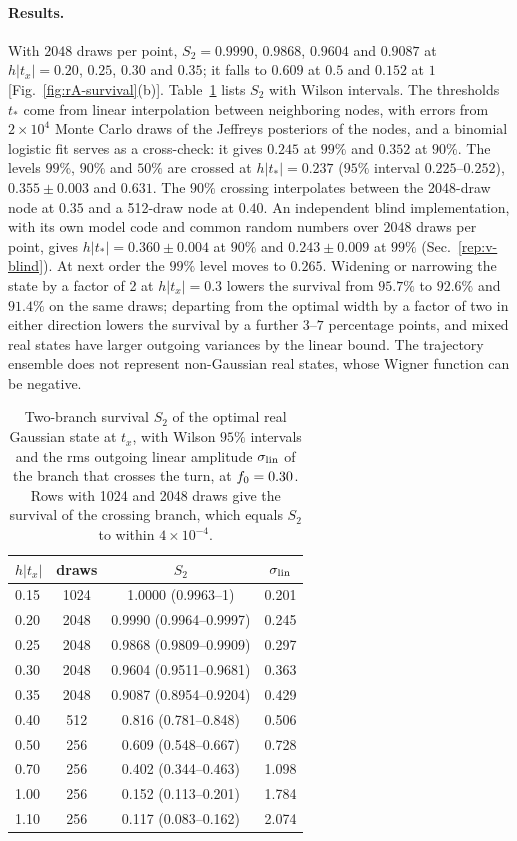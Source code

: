 \paragraph{Results.}
With $2048$ draws per point, $S_2=0.9990$, $0.9868$, $0.9604$ and $0.9087$ at $h|t_x|=0.20$, $0.25$, $0.30$ and $0.35$; it falls to $0.609$ at $0.5$ and $0.152$ at $1$ [Fig.~\ref{fig:rA-survival}(b)]. %
Table~\ref{tab:rA-S2} lists $S_2$ with Wilson intervals.
The thresholds $t_*$ come from linear interpolation between neighboring nodes, with errors from $2\times10^4$ Monte Carlo draws of the Jeffreys posteriors of the nodes, and a binomial logistic fit serves as a cross-check: it gives $0.245$ at $99\%$ and $0.352$ at $90\%$. %
The levels $99\%$, $90\%$ and $50\%$ are crossed at $h|t_*|=0.237$ ($95\%$ interval $0.225$--$0.252$), $0.355\pm0.003$ and $0.631$. %
The $90\%$ crossing interpolates between the 2048-draw node at $0.35$ and a 512-draw node at $0.40$. %
An independent blind implementation, with its own model code and common random numbers over $2048$ draws per point, gives $h|t_*|=0.360\pm0.004$ at $90\%$ and $0.243\pm0.009$ at $99\%$ (Sec.~\ref{rep:v-blind}). %
At next order the $99\%$ level moves to $0.265$. %
Widening or narrowing the state by a factor of 2 at $h|t_x|=0.3$ lowers the survival from $95.7\%$ to $92.6\%$ and $91.4\%$ on the same draws; departing from the optimal width by a factor of two in either direction lowers the survival by a further $3$--$7$ percentage points, and mixed real states have larger outgoing variances by the linear bound. %
The trajectory ensemble does not represent non-Gaussian real states, whose Wigner function can be negative.

\begin{table}[tbp]
\centering
\caption{Two-branch survival $S_2$ of the optimal real Gaussian state at $t_x$, with Wilson $95\%$ intervals and the rms outgoing linear amplitude $\sigma_{\rm lin}$ of the branch that crosses the turn, at $f_0=0.30$. Rows with 1024 and 2048 draws give the survival of the crossing branch, which equals $S_2$ to within $4\times10^{-4}$.}
\label{tab:rA-S2}
\begin{tabular}{lccc}
\toprule
$h|t_x|$ & draws & $S_2$ & $\sigma_{\rm lin}$\\
\midrule
0.15 & 1024 & 1.0000 (0.9963--1) & 0.201\\ %
0.20 & 2048 & 0.9990 (0.9964--0.9997) & 0.245\\ %
0.25 & 2048 & 0.9868 (0.9809--0.9909) & 0.297\\ %
0.30 & 2048 & 0.9604 (0.9511--0.9681) & 0.363\\ %
0.35 & 2048 & 0.9087 (0.8954--0.9204) & 0.429\\ %
0.40 & 512 & 0.816 (0.781--0.848) & 0.506\\ %
0.50 & 256 & 0.609 (0.548--0.667) & 0.728\\ %
0.70 & 256 & 0.402 (0.344--0.463) & 1.098\\ %
1.00 & 256 & 0.152 (0.113--0.201) & 1.784\\ %
1.10 & 256 & 0.117 (0.083--0.162) & 2.074\\ %
\bottomrule
\end{tabular}
\end{table}

